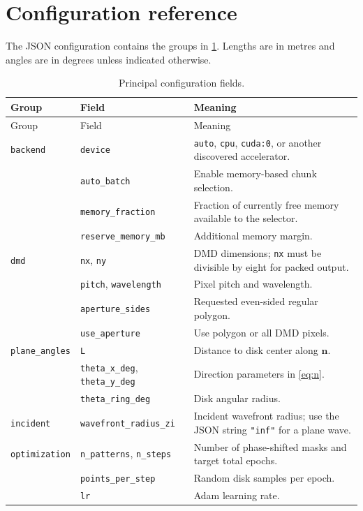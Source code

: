 \documentclass[11pt,a4paper]{article}
\newcommand{\vect}[1]{\bm{#1}}
\begin{document}
\section{Configuration reference}
The JSON configuration contains the groups in \cref{tab:config}. Lengths are in metres and angles are in degrees unless indicated otherwise.
\begin{longtable}{@{}p{31mm}p{37mm}p{79mm}@{}}
\caption{Principal configuration fields.}\label{tab:config}\\
\toprule
Group & Field & Meaning \\
\midrule
\endfirsthead
\toprule
Group & Field & Meaning \\
\midrule
\endhead
\texttt{backend} & \texttt{device} & \texttt{auto}, \texttt{cpu}, \texttt{cuda:0}, or another discovered accelerator. \\
 & \texttt{auto\_batch} & Enable memory-based chunk selection. \\
 & \texttt{memory\_fraction} & Fraction of currently free memory available to the selector. \\
 & \texttt{reserve\_memory\_mb} & Additional memory margin. \\
\addlinespace
\texttt{dmd} & \texttt{nx}, \texttt{ny} & DMD dimensions; \texttt{nx} must be divisible by eight for packed output. \\
 & \texttt{pitch}, \texttt{wavelength} & Pixel pitch and wavelength. \\
 & \texttt{aperture\_sides} & Requested even-sided regular polygon. \\
 & \texttt{use\_aperture} & Use polygon or all DMD pixels. \\
\addlinespace
\texttt{plane\_angles} & \texttt{L} & Distance to disk center along $\vect n$. \\
 & \texttt{theta\_x\_deg}, \texttt{theta\_y\_deg} & Direction parameters in \cref{eq:n}. \\
 & \texttt{theta\_ring\_deg} & Disk angular radius. \\
\addlinespace
\texttt{incident} & \texttt{wavefront\_radius\_zi} & Incident wavefront radius; use the JSON string \texttt{"inf"} for a plane wave. \\
\addlinespace
\texttt{optimization} & \texttt{n\_patterns}, \texttt{n\_steps} & Number of phase-shifted masks and target total epochs. \\
 & \texttt{points\_per\_step} & Random disk samples per epoch. \\
 & \texttt{lr} & Adam learning rate. \\

\end{longtable}
\end{document}
